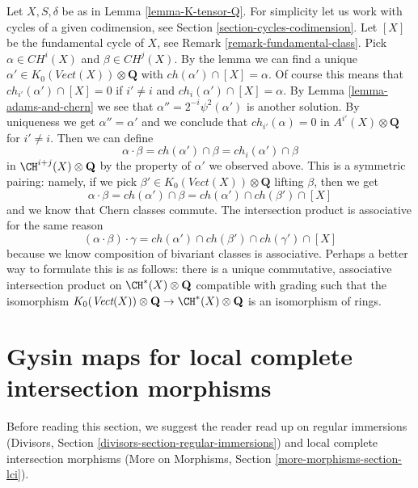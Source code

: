 \noindent
Let $X, S, \delta$ be as in Lemma \ref{lemma-K-tensor-Q}.
For simplicity let us work with cycles of a given codimension, see
Section \ref{section-cycles-codimension}.
Let $[X]$ be the fundamental cycle of $X$, see
Remark \ref{remark-fundamental-class}.
Pick $\alpha \in CH^i(X)$ and
$\beta \in CH^j(X)$. By the lemma we can find a unique
$\alpha' \in K_0(\textit{Vect}(X)) \otimes \mathbf{Q}$ with
$ch(\alpha') \cap [X]  = \alpha$.
Of course this means that $ch_{i'}(\alpha') \cap [X] = 0$
if $i' \not = i$ and $ch_i(\alpha') \cap [X] = \alpha$.
By Lemma \ref{lemma-adams-and-chern} we see that
$\alpha'' = 2^{-i}\psi^2(\alpha')$ is another solution.
By uniqueness we get $\alpha'' = \alpha'$ and we conclude
that $ch_{i'}(\alpha) = 0$ in $A^{i'}(X) \otimes \mathbf{Q}$
for $i' \not = i$. Then we can define
$$
\alpha \cdot \beta = ch(\alpha') \cap \beta =
ch_i(\alpha') \cap \beta
$$
in $\CH^{i + j}(X) \otimes \mathbf{Q}$ by the property of $\alpha'$
we observed above. This is a symmetric pairing: namely, if we pick
$\beta' \in K_0(\textit{Vect}(X)) \otimes \mathbf{Q}$ lifting
$\beta$, then we get
$$
\alpha \cdot \beta = ch(\alpha') \cap \beta =
ch(\alpha') \cap ch(\beta') \cap [X]
$$
and we know that Chern classes commute.
The intersection product is associative for the same reason
$$
(\alpha \cdot \beta) \cdot \gamma =
ch(\alpha') \cap ch(\beta') \cap ch(\gamma') \cap [X]
$$
because we know composition of bivariant classes is associative.
Perhaps a better way to formulate this is as follows: there is
a unique commutative, associative intersection product on
$\CH^*(X) \otimes \mathbf{Q}$ compatible with grading such that
the isomorphism
$K_0(\textit{Vect}(X)) \otimes \mathbf{Q} \to \CH^*(X) \otimes \mathbf{Q}$
is an isomorphism of rings.






\section{Gysin maps for local complete intersection morphisms}
\label{section-koszul}

\noindent
Before reading this section, we suggest the reader read up on
regular immersions
(Divisors, Section \ref{divisors-section-regular-immersions}) and
local complete intersection morphisms
(More on Morphisms, Section \ref{more-morphisms-section-lci}).

